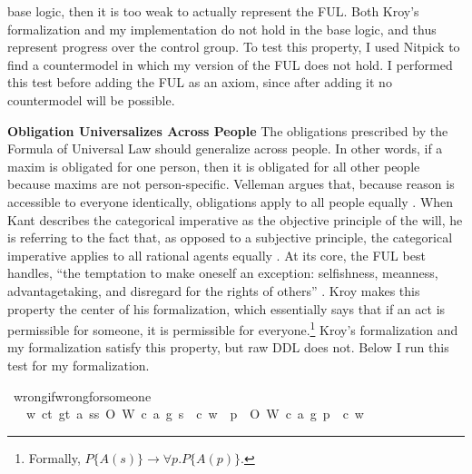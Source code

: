 \begin{isabellebody}
\begin{isamarkuptext}
base logic, then it is too weak to actually represent the FUL. Both Kroy's formalization
and my implementation do not hold in the base logic, and thus represent progress over the control group.
To test this property, I used Nitpick to find a countermodel in which my version of the FUL does not hold. 
I performed this test before adding the FUL as an axiom, since after adding it no countermodel will
be possible.%
\end{isamarkuptext}\isamarkuptrue%
%
\begin{isamarkuptext}%
\medskip
\noindent \textbf{Obligation Universalizes Across People} The obligations prescribed by the Formula of Universal Law
should generalize across people. In other words, if a maxim is obligated for one person, then it is obligated
for all other people because maxims are not person-specific. Velleman argues that, because 
reason is accessible to everyone identically, obligations apply to all people equally \citep[25]{velleman}. 
When Kant describes the categorical imperative as the objective principle of the will, he is referring 
to the fact that, as opposed to a subjective principle, the categorical imperative applies to all 
rational agents equally \citep[16]{groundwork}. At its core, the FUL best handles, ``the temptation 
to make oneself an exception: selfishness, meanness, advantagetaking, and disregard for the rights 
of others'' \citep[30]{KorsgaardFUL}. Kroy makes this property the center of his
formalization, which essentially says that if an act is permissible for someone, it is permissible for 
everyone.\footnote{Formally, $P\{A(s)\} \longrightarrow \forall p. P\{A(p)\}$.} Kroy's formalization and 
my formalization satisfy this property, but raw DDL does not. Below I run
this test for my formalization.%
\end{isamarkuptext}\isamarkuptrue%
\isamarkupfalse%
\ wrong{\isacharunderscore}if{\isacharunderscore}wrong{\isacharunderscore}for{\isacharunderscore}someone{\isacharcolon}\isanewline
\ \ \ {\isachardoublequoteopen}{\isasymforall}w{\isachardot}\ {\isasymforall}c{\isacharcolon}{\isacharcolon}t{\isachardot}\ {\isasymforall}g{\isacharcolon}{\isacharcolon}t{\isachardot}\ {\isasymforall}a{\isachardot}\ {\isasymexists}s{\isacharcolon}{\isacharcolon}s{\isachardot}\ O{\isacharbraceleft}\isactrlbold {\isasymnot}\ {\isacharparenleft}W\ {\isacharparenleft}c{\isacharcomma}\ a{\isacharcomma}\ g{\isacharparenright}\ s{\isacharparenright}\ {\isacharbar}\ c{\isacharbraceright}\ w\ {\isasymlongrightarrow}\ {\isacharparenleft}{\isasymforall}p{\isachardot}\ \ O{\isacharbraceleft}\isactrlbold {\isasymnot}\ {\isacharparenleft}W\ {\isacharparenleft}c{\isacharcomma}\ a{\isacharcomma}\ g{\isacharparenright}\ p{\isacharparenright}\ {\isacharbar}\ c{\isacharbraceright}\ w{\isacharparenright}\ {\isachardoublequoteclose}\isanewline

\end{isabellebody}
